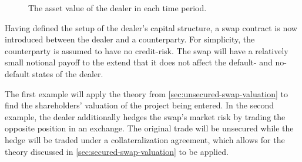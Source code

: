 \documentclass[main.tex]{subfiles}
\begin{document}
        \begin{figure}[H]
            \centering
            \caption{The asset value of the dealer in each time period.}
            \label{fig:example-asset-value-multi-period-dealer}
        \end{figure}

        Having defined the setup of the dealer's capital structure,
        a swap contract is now introduced between the dealer and a counterparty.
        For simplicity, the counterparty is assumed to have no credit-risk.
        The swap will have a relatively small notional payoff to the extend
        that it does not affect the default- and no-default states of the dealer.

        The first example will apply the theory from \cref{sec:unsecured-swap-valuation}
        to find the shareholders' valuation of the project being entered.
        In the second example, the dealer additionally hedges the swap's market risk 
        by trading the opposite position in an exchange.
        The original trade will be unsecured 
        while the hedge will be traded under a collateralization agreement,
        which allows for the theory discussed in \cref{sec:secured-swap-valuation} to be applied.
\end{document}
